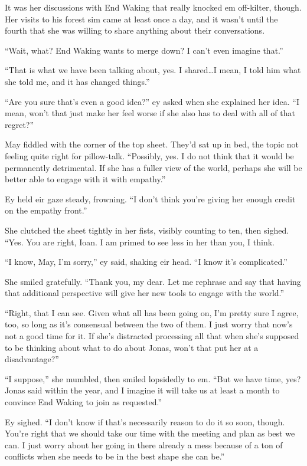 It was her discussions with End Waking that really knocked em off-kilter, though. Her visits to his forest sim came at least once a day, and it wasn't until the fourth that she was willing to share anything about their conversations.

``Wait, what? End Waking wants to merge down? I can't even imagine that.''

``That is what we have been talking about, yes. I shared\ldots I mean, I told him what she told me, and it has changed things.''

``Are you sure that's even a good idea?'' ey asked when she explained her idea. ``I mean, won't that just make her feel worse if she also has to deal with all of that regret?''

May fiddled with the corner of the top sheet. They'd sat up in bed, the topic not feeling quite right for pillow-talk. ``Possibly, yes. I do not think that it would be permanently detrimental. If she has a fuller view of the world, perhaps she will be better able to engage with it with empathy.''

Ey held eir gaze steady, frowning. ``I don't think you're giving her enough credit on the empathy front.''

She clutched the sheet tightly in her fists, visibly counting to ten, then sighed. ``Yes. You are right, Ioan. I am primed to see less in her than you, I think.

``I know, May, I'm sorry,'' ey said, shaking eir head. ``I know it's complicated.''

She smiled gratefully. ``Thank you, my dear. Let me rephrase and say that having that additional perspective will give her new tools to engage with the world.''

``Right, that I can see. Given what all has been going on, I'm pretty sure I agree, too, so long as it's consensual between the two of them. I just worry that now's not a good time for it. If she's distracted processing all that when she's supposed to be thinking about what to do about Jonas, won't that put her at a disadvantage?''

``I suppose,'' she mumbled, then smiled lopsidedly to em. ``But we have time, yes? Jonas said within the year, and I imagine it will take us at least a month to convince End Waking to join as requested.''

Ey sighed. ``I don't know if that's necessarily reason to do it so soon, though. You're right that we should take our time with the meeting and plan as best we can. I just worry about her going in there already a mess because of a ton of conflicts when she needs to be in the best shape she can be.''

